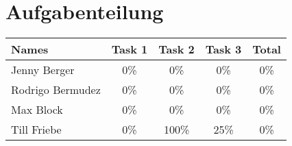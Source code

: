 \newpage
\section{Aufgabenteilung}
\begin{table}[htpb]
    \center
	\label{tab:Aufgabenteilung}
    \begin{tabular}{l|c|c|c|c}
        \large{Names}    & \large{Task 1} & \large{Task 2} & \large{Task 3} & \large{Total} \\ \hline
        Jenny Berger     &            0\% &            0\% &            0\% &           0\% \\
        Rodrigo Bermudez &            0\% &            0\% &            0\% &           0\% \\
        Max Block        &            0\% &            0\% &            0\% &           0\% \\
        Till Friebe      &            0\% &          100\% &           25\% &           0\%
    \end{tabular}

\end{table}

